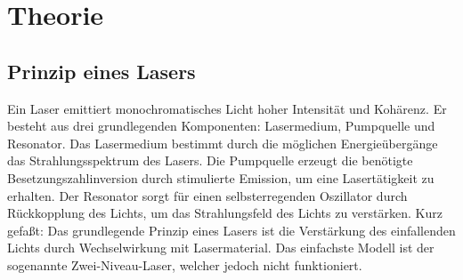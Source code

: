 \section{Theorie}
\subsection{Prinzip eines Lasers}
Ein Laser emittiert monochromatisches Licht hoher Intensität und
Kohärenz.  Er besteht aus drei grundlegenden Komponenten: Lasermedium,
Pumpquelle und Resonator.  Das Lasermedium bestimmt durch die möglichen
Energieübergänge das Strahlungsspektrum des Lasers.  Die Pumpquelle
erzeugt die benötigte Besetzungszahlinversion durch stimulierte
Emission, um eine Lasertätigkeit zu erhalten.  Der Resonator sorgt für
einen selbsterregenden Oszillator durch Rückkopplung des Lichts, um das
Strahlungsfeld des Lichts zu verstärken.  Kurz gefaßt: Das grundlegende
Prinzip eines Lasers ist die Verstärkung des einfallenden Lichts durch
Wechselwirkung mit Lasermaterial.  Das einfachste Modell ist der
sogenannte Zwei-Niveau-Laser, welcher jedoch nicht funktioniert.

